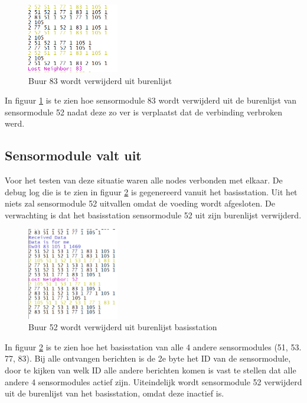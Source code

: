 \documentclass[a4paper, 11pt]{article}
\begin{document}
\begin{figure}[h!]
	\centering
	\includegraphics[width=4cm]{TestResults/LooptWegVanNode/LoopWegBijBuur_52_83.PNG}
	\caption{Buur 83 wordt verwijderd uit burenlijst} \label{LoopWegVanNode}
\end{figure}
In figuur \ref{LoopWegVanNode} is te zien hoe sensormodule 83 wordt verwijderd uit de burenlijst van sensormodule 52 nadat deze zo ver is verplaatst dat de verbinding verbroken werd.

\subsection{Sensormodule valt uit} \label{ValtUit}
Voor het testen van deze situatie waren alle nodes verbonden met elkaar. De debug log die is te zien in figuur \ref{NodeValtUit} is gegenereerd vanuit het basisstation. Uit het niets zal sensormodule 52 uitvallen omdat de voeding wordt afgesloten. De verwachting is dat het basisstation sensormodule 52 uit zijn burenlijst verwijderd.
\begin{figure}[h!]
	\centering
	\includegraphics[width=4cm]{TestResults/NodeValtUit/NodeValtWeg_klein.png}
	\caption{Buur 52 wordt verwijderd uit burenlijst basisstation} \label{NodeValtUit}
\end{figure}
In figuur \ref{NodeValtUit} is te zien hoe het basisstation van alle 4 andere sensormodules (51, 53. 77, 83). Bij alle ontvangen berichten is de 2e byte het ID van de sensormodule, door te kijken van welk ID alle andere berichten komen is vast te stellen dat alle andere 4 sensormodules actief zijn. Uiteindelijk wordt sensormodule 52 verwijderd uit de burenlijst van het basisstation, omdat deze inactief is.
\end{document}
